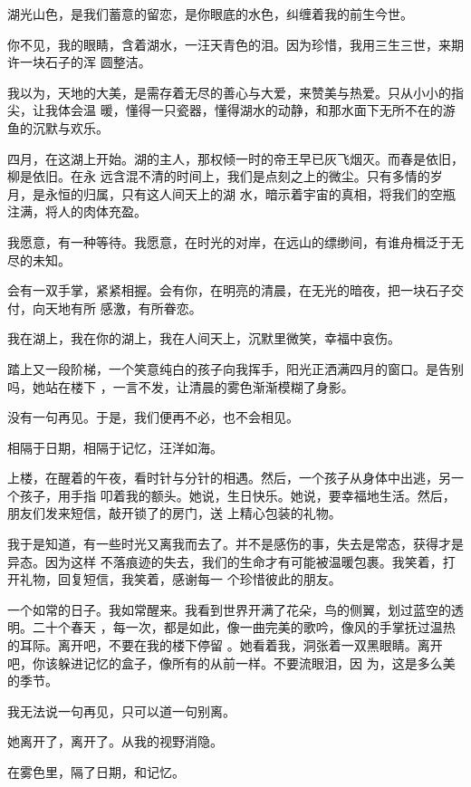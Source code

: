 \documentclass[12pt,a4paper]{article}
\begin{document}
		湖光山色，是我们蓄意的留恋，是你眼底的水色，纠缠着我的前生今世。

		你不见，我的眼睛，含着湖水，一汪天青色的泪。因为珍惜，我用三生三世，来期许一块石子的浑
	圆整洁。

		我以为，天地的大美，是需存着无尽的善心与大爱，来赞美与热爱。只从小小的指尖，让我体会温
	暖，懂得一只瓷器，懂得湖水的动静，和那水面下无所不在的游鱼的沉默与欢乐。


		四月，在这湖上开始。湖的主人，那权倾一时的帝王早已灰飞烟灭。而春是依旧，柳是依旧。在永
	远含混不清的时间上，我们是点刻之上的微尘。只有多情的岁月，是永恒的归属，只有这人间天上的湖
	水，暗示着宇宙的真相，将我们的空瓶注满，将人的肉体充盈。


		我愿意，有一种等待。我愿意，在时光的对岸，在远山的缥缈间，有谁舟楫泛于无尽的未知。

		会有一双手掌，紧紧相握。会有你，在明亮的清晨，在无光的暗夜，把一块石子交付，向天地有所
	感激，有所眷恋。


		我在湖上，我在你的湖上，我在人间天上，沉默里微笑，幸福中哀伤。

	\endwriting



		踏上又一段阶梯，一个笑意纯白的孩子向我挥手，阳光正洒满四月的窗口。是告别吗，她站在楼下
	，一言不发，让清晨的雾色渐渐模糊了身影。

		没有一句再见。于是，我们便再不必，也不会相见。

		相隔于日期，相隔于记忆，汪洋如海。

		上楼，在醒着的午夜，看时针与分针的相遇。然后，一个孩子从身体中出逃，另一个孩子，用手指
	叩着我的额头。她说，生日快乐。她说，要幸福地生活。然后，朋友们发来短信，敲开锁了的房门，送
	上精心包装的礼物。

		我于是知道，有一些时光又离我而去了。并不是感伤的事，失去是常态，获得才是异态。因为这样
	不落痕迹的失去，我们的生命才有可能被温暖包裹。我笑着，打开礼物，回复短信，我笑着，感谢每一
	个珍惜彼此的朋友。

		一个如常的日子。我如常醒来。我看到世界开满了花朵，鸟的侧翼，划过蓝空的透明。二十个春天
	，每一次，都是如此，像一曲完美的歌吟，像风的手掌抚过温热的耳际。离开吧，不要在我的楼下停留
	。她看着我，洞张着一双黑眼睛。离开吧，你该躲进记忆的盒子，像所有的从前一样。不要流眼泪，因
	为，这是多么美的季节。


		我无法说一句再见，只可以道一句别离。

		她离开了，离开了。从我的视野消隐。

		在雾色里，隔了日期，和记忆。
\end{document}
